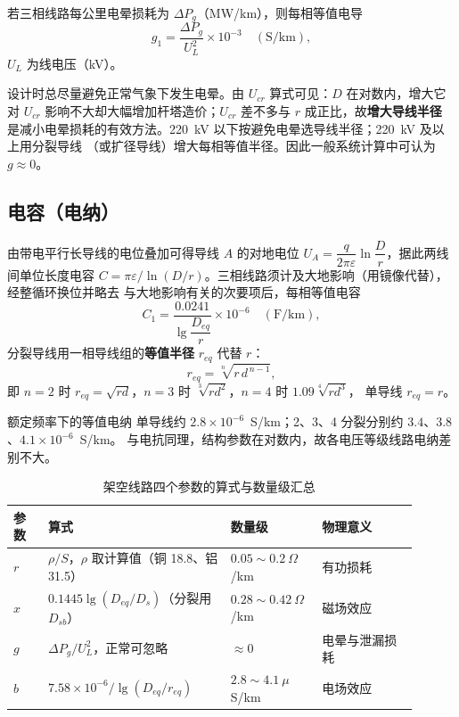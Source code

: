 若三相线路每公里电晕损耗为 $\Delta P_g$（MW/km），则每相等值电导
\begin{equation}
  g_1=\frac{\Delta P_g}{U_L^{2}}\times10^{-3}\quad(\text{S/km}),
\end{equation}
$U_L$ 为线电压（kV）。

设计时总尽量避免正常气象下发生电晕。由 $U_{cr}$ 算式可见：$D$ 在对数内，增大它对
$U_{cr}$ 影响不大却大幅增加杆塔造价；$U_{cr}$ 差不多与 $r$ 成正比，故\textbf{增大导线半径}
是减小电晕损耗的有效方法。220~kV 以下按避免电晕选导线半径；220~kV 及以上用分裂导线
（或扩径导线）增大每相等值半径。因此一般系统计算中可认为 $g\approx0$。

\subsection{电容（电纳）}

由带电平行长导线的电位叠加可得导线 $A$ 的对地电位
$U_A=\dfrac{q}{2\pi\varepsilon}\ln\dfrac{D}{r}$，据此两线间单位长度电容
$C=\pi\varepsilon/\ln(D/r)$。三相线路须计及大地影响（用镜像代替），经整循环换位并略去
与大地影响有关的次要项后，每相等值电容
\begin{equation}
  C_1=\frac{0.0241}{\lg\dfrac{D_{eq}}{r}}\times10^{-6}\quad(\text{F/km}),
\end{equation}
分裂导线用一相导线组的\textbf{等值半径} $r_{eq}$ 代替 $r$：
\begin{equation}
  r_{eq}=\sqrt[n]{r\,d^{\,n-1}},
\end{equation}
即 $n=2$ 时 $r_{eq}=\sqrt{rd}$，$n=3$ 时 $\sqrt[3]{rd^{2}}$，$n=4$ 时 $1.09\sqrt[4]{rd^{3}}$，
单导线 $r_{eq}=r$。

额定频率下的等值电纳
单导线约 $2.8\times10^{-6}$~S/km；2、3、4 分裂分别约 $3.4$、$3.8$、$4.1\times10^{-6}$~S/km。
与电抗同理，结构参数在对数内，故各电压等级线路电纳差别不大。

\begin{table}[htbp]
  \centering
  \caption{架空线路四个参数的算式与数量级汇总}
  \small
  \begin{tabular}{@{}p{0.08\linewidth}p{0.42\linewidth}p{0.18\linewidth}p{0.22\linewidth}@{}}
    \toprule
    参数 & 算式 & 数量级 & 物理意义 \\
    \midrule
    $r$ & $\rho/S$，$\rho$ 取计算值（铜 18.8、铝 31.5） & $0.05\sim0.2\ \Omega$/km & 有功损耗 \\
    $x$ & $0.1445\lg(D_{eq}/D_s)$（分裂用 $D_{sb}$） & $0.28\sim0.42\ \Omega$/km & 磁场效应 \\
    $g$ & $\Delta P_g/U_L^{2}$，正常可忽略 & $\approx0$ & 电晕与泄漏损耗 \\
    $b$ & $7.58\times10^{-6}/\lg(D_{eq}/r_{eq})$ & $2.8\sim4.1\ \mu$S/km & 电场效应 \\
    \bottomrule
  \end{tabular}
\end{table}

